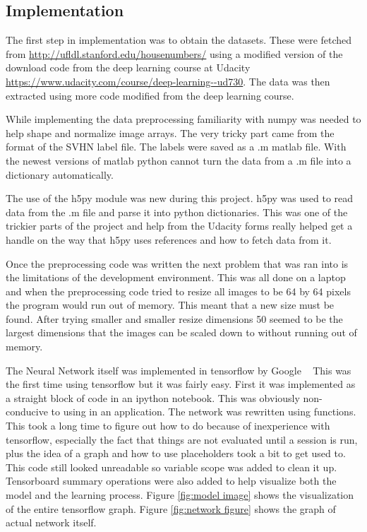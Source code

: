 \documentclass[12pt,twocolumn,letterpaper]{article}
\begin{document}
\subsection{Implementation}
The first step in implementation was to obtain the datasets. These were fetched 
from \url{http://ufldl.stanford.edu/housenumbers/} using a modified version of 
the download code from the deep learning course at Udacity 
\url{https://www.udacity.com/course/deep-learning--ud730}. The data was then 
extracted using more code modified from the deep learning course. 

While implementing the data preprocessing familiarity with numpy was needed to help 
shape and normalize image arrays. The very tricky part came from the format of 
the SVHN label file. The labels were saved as a .m matlab file. With the newest 
versions of matlab python cannot turn the data from a .m file into a dictionary 
automatically. 

The use of the h5py module was new during this project. h5py was used to read 
data from the .m file and parse it into python dictionaries. This was one of the 
trickier parts of the project and help from the Udacity forms really helped get 
a handle on the way that h5py uses references and how to fetch data from it.

Once the preprocessing code was written the next problem that was ran into is the
limitations of the development environment. This was all done on a laptop and when the 
preprocessing code tried to resize all images to be 64 by 64 pixels the program 
would run out of memory. This meant that a new size must be found. After trying 
smaller and smaller resize dimensions 50 seemed to be the largest dimensions that 
the images can be scaled down to without running out of memory.

The Neural Network itself was implemented in tensorflow by Google ~\cite{Google} 
This was the first time using tensorflow but it was fairly easy. First it was 
implemented as a straight block of code in an ipython notebook. This was 
obviously non-conducive to using in an application. The network was rewritten 
using functions. This took a long time to figure out how to do because of 
inexperience with tensorflow, especially the fact that things are not evaluated 
until a session is run, plus the idea of a graph and how to use placeholders 
took a bit to get used to. This code still looked unreadable so variable scope 
was added to clean it up. Tensorboard summary operations were also added to help 
visualize both the model and the learning process. Figure \ref{fig:model image} shows the visualization 
of the entire tensorflow graph. Figure \ref{fig:network figure} shows the graph of actual network itself.
\end{document}
